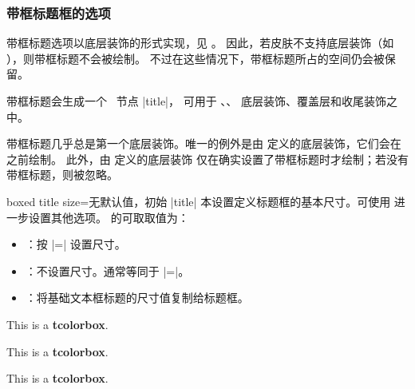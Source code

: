 \clearpage
\subsubsection{带框标题框的选项}
\begin{marker}
  带框标题选项以底层装饰的形式实现，见 。
  因此，若皮肤不支持底层装饰（如 ），则带框标题不会被绘制。
  不过在这些情况下，带框标题所占的空间仍会被保留。
\end{marker}

\begin{marker}
  带框标题会生成一个 \tikzname\ 节点 |title|，
  可用于 、、
  底层装饰、覆盖层和收尾装饰之中。
\end{marker}

\begin{marker}
  带框标题几乎总是第一个底层装饰。唯一的例外是由
   定义的底层装饰，它们会在之前绘制。
  此外，由  定义的底层装饰
  仅在确实设置了带框标题时才绘制；若没有带框标题，则被忽略。
\end{marker}



\begin{docTcbKey}[][doc new=2016-02-26]{boxed title size}{=}{无默认值，初始 |title|}
  本设置定义标题框的基本尺寸。可使用 
  进一步设置其他选项。 的可取取值为：
  \begin{itemize}
  \item{}：按 |=| 设置尺寸。
  \item{}：不设置尺寸。通常等同于
    |=|。
  \item{}：将基础文本框标题的尺寸值复制给标题框。
  \end{itemize}

\begin{dispExample}
\begin{tcbraster}[raster columns=3,enhanced,boxrule=0.4pt,
    title=My title,attach boxed title to top center]
  \begin{tcolorbox}[boxed title size=title]
    This is a \textbf{tcolorbox}.
  \end{tcolorbox}
  \begin{tcolorbox}[boxed title size=standard]
    This is a \textbf{tcolorbox}.
  \end{tcolorbox}
  \begin{tcolorbox}[boxed title size=copy]
    This is a \textbf{tcolorbox}.
  \end{tcolorbox}
\end{tcbraster}
\end{dispExample}

\end{docTcbKey}


